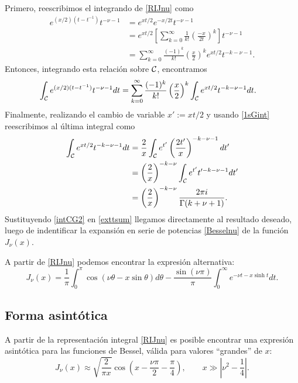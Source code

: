 Primero, reescribimos el integrando de \eqref{RIJnu} como
\begin{align}
e^{(x/2)(t-t^{-1})}t^{-\nu-1} &= e^{xt/2}e^{-x/2t}t^{-\nu-1} \\
&= e^{xt/2}\left[\sum_{k=0}^\infty\frac{1}{k!}\left(\frac{-x}{2t}\right)^k\right]t^{-\nu-1} \\
&= \sum_{k=0}^\infty\frac{(-1)^k}{k!}\left(\frac{x}{2}\right)^ke^{xt/2}t^{-k-\nu-1}. \label{exttsum}
\end{align}
Entonces, integrando esta relación sobre $\cal C$, encontramos
\begin{align}
\int_{\cal C}e^{(x/2)(t-t^{-1})}t^{-\nu-1}dt &= \sum_{k=0}^\infty\frac{(-1)^k}{k!}\left(\frac{x}{2}\right)^k\int_{\cal C}e^{xt/2}t^{-k-\nu-1}dt .
\end{align}
Finalmente, realizando el cambio de variable $x':=xt/2$ y usando \eqref{1sGint} reescribimos al última integral como
\begin{align}
\int_{\cal C}e^{xt/2}t^{-k-\nu-1}dt &= \frac{2}{x}\int_{\cal C}e^{t'}\left(\frac{2t'}{x}\right)^{-k-\nu-1}dt' \\
&= \left(\frac{2}{x}\right)^{-k-\nu}\int_{\cal C}e^{t'}t'^{-k-\nu-1}dt' \\
&= \left(\frac{2}{x}\right)^{-k-\nu}\frac{2\pi i}{\Gamma(k+\nu+1)}. \label{intCG2}
\end{align}
Sustituyendo \eqref{intCG2} en \eqref{exttsum} llegamos directamente al resultado deseado, luego de indentificar la expansión en serie de potencias \eqref{Besselnu} de la función $J_\nu(x)$.

A partir de \eqref{RIJnu} podemos encontrar la expresión alternativa:
\begin{equation}
\boxed{J_\nu(x)=\frac{1}{\pi}\int_0^\pi\cos(\nu\theta-x\sin\theta)d\theta-\frac{\sin(\nu\pi)}{\pi}\int_0^\infty e^{-\nu t-x\sinh t}dt.}
\end{equation}

\subsection{Forma asintótica}
A partir de la representación integral \eqref{RIJnu} es posible encontrar una expresión asintótica para las funciones de Bessel, válida para valores ``grandes'' de $x$:
\begin{equation}\label{asinJnu}
J_\nu(x)\approx \sqrt{\frac{2}{\pi x}}\cos\left(x-\frac{\nu\pi}{2}-\frac{\pi}{4}\right), 
\qquad x\gg\left|\nu^2-\frac{1}{4}\right|.
\end{equation}

